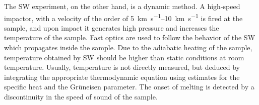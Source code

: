 The SW experiment, on the other hand,
is a dynamic method.
A high-speed impactor, with a velocity of the
order of \SIrange{5}{10}{\kilo\meter\per\second} is fired at the sample, and upon impact it generates high pressure and increases the temperature of the sample\cite{Sola:2009dw}.
Fast optics are used to follow the behavior of the SW which propagates inside the sample.
Due to the adiabatic heating of the sample, temperature obtained by SW should be higher than static conditions at room temperature.
Usually, temperature is not directly measured, but deduced by integrating the appropriate thermodynamic equation using estimates for the specific heat and the Grüneisen parameter.
The onset of melting is detected by a discontinuity in the speed of sound of the sample.



